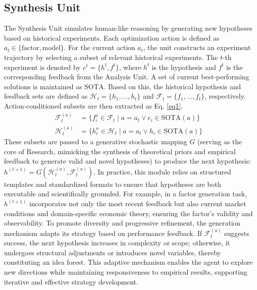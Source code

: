 \documentclass{article}
\begin{document}
\subsection{Synthesis Unit}
The Synthesis Unit simulates human-like reasoning by generating new hypotheses based on historical experiments.
Each optimization action is defined as $a_t \in \{\text{factor}, \text{model}\}$.
For the current action $a_t$, the unit constructs an experiment trajectory by selecting a subset of relevant historical experiments. The $t$-th experiment is denoted by $e^t = \{h^t, f^t\}$, where $h^t$ is the hypothesis and $f^t$ is the corresponding feedback from the Analysis Unit.
A set of current best-performing solutions is maintained as $\text{SOTA}$. Based on this, the historical hypothesis and feedback sets are defined as $\mathcal{H}_t = \{h_1, \dots, h_t\}$ and $\mathcal{F}_t = \{f_1, \dots, f_t\}$, respectively.
Action-conditioned subsets are then extracted as Eq. \eqref{eq1}.
\begin{equation}
\begin{aligned}
\mathcal{F}_t^{(a)} &= \{ f_{i}^{a} \in \mathcal{F}_t \mid a = a_t \lor e_{i} \in \text{SOTA}(a) \} \\
\mathcal{H}_t^{(a)} &= \{ h_{i}^{a} \in \mathcal{H}_t \mid a = a_t \lor h_{i} \in \text{SOTA}(a) \}
\end{aligned}
\label{eq1}
\end{equation}
These subsets are passed to a generative stochastic mapping $G$ (serving as the core of Research, mimicking the synthesis of theoretical priors and empirical feedback to generate valid and novel hypotheses) to produce the next hypothesis:
$h^{(t+1)} = G(\mathcal{H}_t^{(a)}, \mathcal{F}_t^{(a)})$.
In practice, this module relies on structured templates and standardized formats to ensure that hypotheses are both executable and scientifically grounded. For example, in a factor generation task, $h^{(t+1)}$ incorporates not only the most recent feedback but also current market conditions and domain-specific economic theory, ensuring the factor's validity and observability.
To promote diversity and progressive refinement, the generation mechanism adapts its strategy based on performance feedback. If $\mathcal{F}_t^{(a)}$ suggests success, the next hypothesis increases in complexity or scope; otherwise, it undergoes structural adjustments or introduces novel variables, thereby constituting an idea forest.
This adaptive mechanism enables the agent to explore new directions while maintaining responsiveness to empirical results, supporting iterative and effective strategy development.
\end{document}
